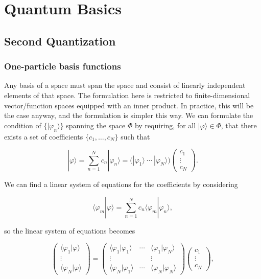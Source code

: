 \chapter{Quantum Basics}

\section{Second Quantization} 

\subsection{One-particle basis functions}

Any basis of a space must span the space and consist of linearly
independent elements of that space. The formulation here is restricted
to finite-dimensional vector/function spaces equipped with an inner
product. In practice, this will be the case anyway, and the
formulation is simpler this way.
We can formulate the condition of $\{|\varphi_n\rangle\}$ spanning the
space $\Phi$ by requiring, for all $|\varphi\rangle\in\Phi$, that there
exists a set of coefficients $\{c_1,\dots,c_N\}$ such that

\begin{equation}\label{eq:basis-expansion}
|\varphi\rangle = \sum_{n=1}^N c_n|\varphi_n\rangle = \big(|\varphi_1\rangle\ \cdots\ |\varphi_N\rangle\big)\begin{pmatrix}c_1\\\vdots\\c_N\end{pmatrix}.
\end{equation}

We can find a linear system of equations for the coefficients by
considering

\begin{equation}
\langle\varphi_m|\varphi\rangle = \sum_{n=1}^N c_n \langle\varphi_m|\varphi_n\rangle,
\end{equation}

so the linear system of equations becomes

\begin{equation}\label{eq:gram-matrix}
\begin{pmatrix}\langle\varphi_1|\varphi\rangle\\\vdots\\\langle\varphi_N|\varphi\rangle\end{pmatrix}
=
\begin{pmatrix}\langle\varphi_1|\varphi_1\rangle & \cdots & \langle\varphi_1|\varphi_N\rangle\\ \vdots & & \vdots \\ \langle\varphi_N|\varphi_1\rangle & \cdots & \langle\varphi_N|\varphi_N\rangle\end{pmatrix}
\begin{pmatrix}c_1\\\vdots\\c_N\end{pmatrix},
\end{equation}

